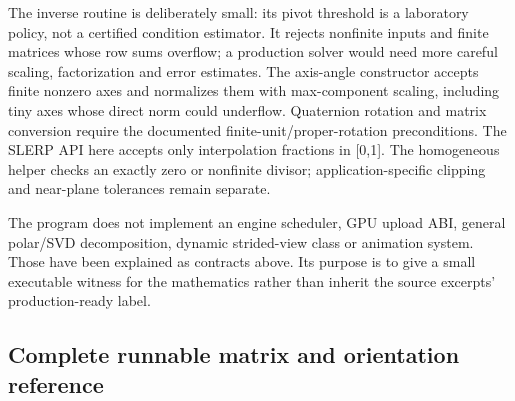 The inverse routine is deliberately small: its pivot threshold is a laboratory policy, not a certified condition estimator. It rejects nonfinite inputs and finite matrices whose row sums overflow; a production solver would need more careful scaling, factorization and error estimates. The axis-angle constructor accepts finite nonzero axes and normalizes them with max-component scaling, including tiny axes whose direct norm could underflow. Quaternion rotation and matrix conversion require the documented finite-unit/proper-rotation preconditions. The SLERP API here accepts only interpolation fractions in {[}0,1{]}. The homogeneous helper checks an exactly zero or nonfinite divisor; application-specific clipping and near-plane tolerances remain separate.

The program does not implement an engine scheduler, GPU upload ABI, general polar/SVD decomposition, dynamic strided-view class or animation system. Those have been explained as contracts above. Its purpose is to give a small executable witness for the mathematics rather than inherit the source excerpts' production-ready label.

\subsection{Complete runnable matrix and orientation reference}\label{02-foundations-ii-ch038-complete-runnable-matrix-and-orientation-reference}

\hypertarget{02-foundations-ii-ch038-complete-runnable-matrix-and-orientation-reference}{}

